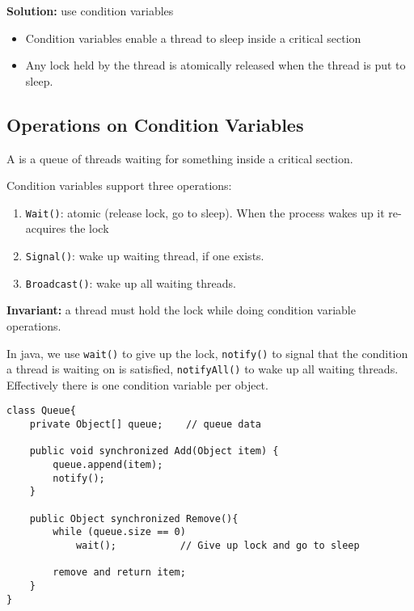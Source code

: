 \textbf{Solution:} use condition variables
\begin{itemize}
    \item Condition variables enable a thread to sleep inside a critical section
    \item Any lock held by the thread is atomically released when the thread is
        put to sleep.
\end{itemize}

\subsection{Operations on Condition Variables}
\begin{dfn}
    A  is a queue of threads waiting for something
    inside a critical section.
\end{dfn}

Condition variables support three operations:
\begin{enumerate}
    \item \texttt{Wait()}: atomic (release lock, go to sleep). When the
        process wakes up it re-acquires the lock
    \item \texttt{Signal()}: wake up waiting thread, if one exists.
    \item \texttt{Broadcast()}: wake up all waiting threads.
\end{enumerate}

\textbf{Invariant:} a thread must hold the lock while doing condition variable
operations.

In java, we use \texttt{wait()} to give up the lock, \texttt{notify()} to signal
that the condition a thread is waiting on is satisfied, \texttt{notifyAll()} to
wake up all waiting threads. Effectively there is one condition variable per
object.

\begin{verbatim}
class Queue{
    private Object[] queue;    // queue data

    public void synchronized Add(Object item) {
        queue.append(item);
        notify();
    }

    public Object synchronized Remove(){
        while (queue.size == 0)
            wait();           // Give up lock and go to sleep

        remove and return item;
    }
}
\end{verbatim}
